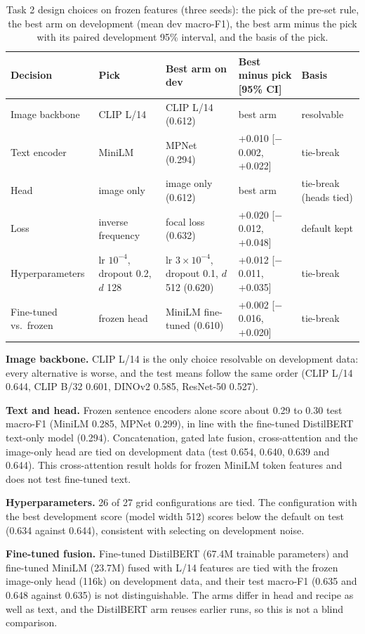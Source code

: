 \documentclass[conference]{IEEEtran}
\begin{document}
\begin{table}[t]
\centering
\caption{Task 2 design choices on frozen features (three seeds): the pick of the pre-set rule, the best arm on development (mean dev macro-F1), the best arm minus the pick with its paired development 95\% interval, and the basis of the pick.}
\label{tab:arch}
\footnotesize
\setlength{\tabcolsep}{4pt}
\begin{tabular}{lllll}
\toprule
Decision & Pick & Best arm on dev & Best minus pick [95\% CI] & Basis \\
\midrule
Image backbone & CLIP L/14 & CLIP L/14 (0.612) & best arm & resolvable \\
Text encoder & MiniLM & MPNet (0.294) & +0.010 [$-$0.002, +0.022] & tie-break \\
Head & image only & image only (0.612) & best arm & tie-break (heads tied) \\
Loss & inverse frequency & focal loss (0.632) & +0.020 [$-$0.012, +0.048] & default kept \\
Hyperparameters & lr $10^{-4}$, dropout 0.2, $d$ 128 & lr $3{\times}10^{-4}$, dropout 0.1, $d$ 512 (0.620) & +0.012 [$-$0.011, +0.035] & tie-break \\
Fine-tuned vs.\ frozen & frozen head & MiniLM fine-tuned (0.610) & +0.002 [$-$0.016, +0.020] & tie-break \\
\bottomrule
\end{tabular}
\end{table}

\textbf{Image backbone.} CLIP L/14 is the only choice resolvable on development data: every alternative is worse, and the test means follow the same order (CLIP L/14 0.644, CLIP B/32 0.601, DINOv2 0.585, ResNet-50 0.527).

\textbf{Text and head.} Frozen sentence encoders alone score about 0.29 to 0.30 test macro-F1 (MiniLM 0.285, MPNet 0.299), in line with the fine-tuned DistilBERT text-only model (0.294). Concatenation, gated late fusion, cross-attention and the image-only head are tied on development data (test 0.654, 0.640, 0.639 and 0.644). This cross-attention result holds for frozen MiniLM token features and does not test fine-tuned text.

\textbf{Hyperparameters.} 26 of 27 grid configurations are tied. The configuration with the best development score (model width 512) scores below the default on test (0.634 against 0.644), consistent with selecting on development noise.

\textbf{Fine-tuned fusion.} Fine-tuned DistilBERT (67.4M trainable parameters) and fine-tuned MiniLM (23.7M) fused with L/14 features are tied with the frozen image-only head (116k) on development data, and their test macro-F1 (0.635 and 0.648 against 0.635) is not distinguishable. The arms differ in head and recipe as well as text, and the DistilBERT arm reuses earlier runs, so this is not a blind comparison.
\end{document}
